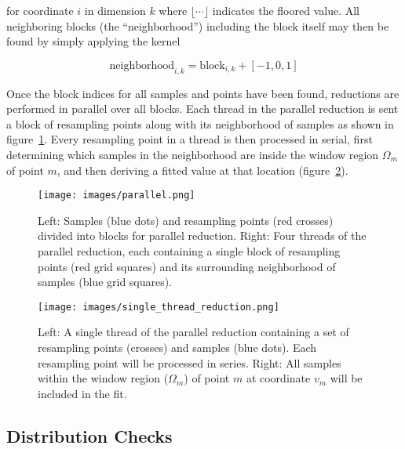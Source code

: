 for coordinate $i$ in dimension $k$ where $\lfloor\cdots\rfloor$ indicates the
floored value.
All neighboring blocks (the ``neighborhood'') including the block itself may
then be found by simply applying the kernel

\begin{equation}
    \text{neighborhood}_{i, k} = \text{block}_{i, k} + [-1, 0, 1]
    \label{eq:equation14}
\end{equation}

Once the block indices for all samples and points have been found, reductions
are performed in parallel over all blocks.
Each thread in the parallel reduction is sent a block of resampling points
along with its neighborhood of samples as shown in
figure~\ref{fig:parallel_reduction}.
Every resampling point in a thread is then processed in serial, first
determining which samples in the neighborhood are inside the window region
$\Omega_m$ of point $m$, and then deriving a fitted value at that location
(figure~\ref{fig:single_thread_reduction}).

\begin{figure}[H]
  \begin{center}
  \texttt{[image: images/parallel.png]}
  \caption{Left: Samples (blue dots) and resampling points (red crosses)
           divided into blocks for parallel reduction.  Right: Four threads
           of the parallel reduction, each containing a single block of
           resampling points (red grid squares) and its surrounding
           neighborhood of samples (blue grid squares).}
  \label{fig:parallel_reduction}
  \end{center}
\end{figure}

\begin{figure}[H]
  \begin{center}
  \texttt{[image: images/single\_thread\_reduction.png]}
  \caption{Left: A single thread of the parallel reduction containing a set
           of resampling points (crosses) and samples (blue dots).  Each
           resampling point will be processed in series.  Right: All samples
           within the window region ($\Omega_m$) of point $m$ at coordinate
           $v_m$ will be included in the fit.}
  \label{fig:single_thread_reduction}
  \end{center}
\end{figure}

\subsection{Distribution Checks}\label{subsec:distribution-checks}

